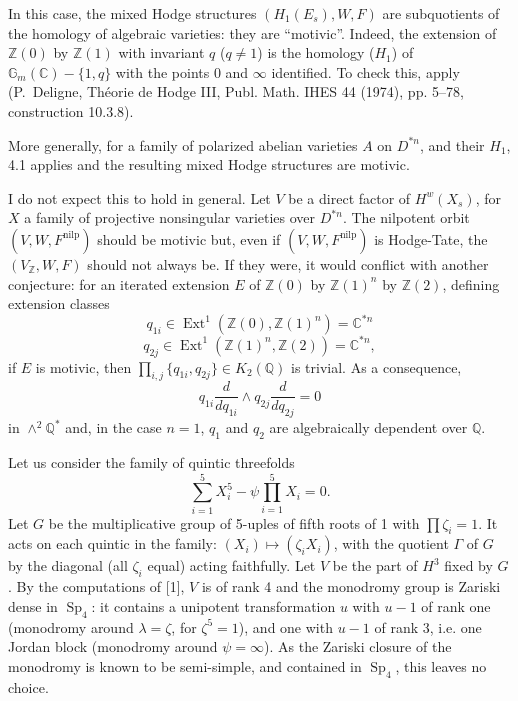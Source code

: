 \documentclass[11pt,a4paper]{article}
\theoremstyle{plain}
\theoremstyle{definition}
\DeclareMathOperator{\Ext}{Ext}
\DeclareMathOperator{\Sp}{Sp}
\begin{document}
In this case, the mixed Hodge structures $(H_{1}(E_{s}), W, F)$ are subquotients of the homology of algebraic varieties: they are ``motivic''. Indeed, the extension of $\mathbb{Z}(0)$ by $\mathbb{Z}(1)$ with invariant $q$ ($q \neq 1$) is the homology ($H_{1}$) of $\mathbb{G}_{m}(\mathbb{C}) - \{1,q\}$ with the points 0 and $\infty$ identified. To check this, apply (P.~Deligne, Th\'eorie de Hodge III, Publ. Math. IHES 44 (1974), pp. 5--78, construction 10.3.8).

More generally, for a family of polarized abelian varieties $A$ on $D^{*n}$, and their $H_{1}$, 4.1 applies and the resulting mixed Hodge structures are motivic.

I do not expect this to hold in general. Let $V$ be a direct factor of $H^{w}(X_{s})$, for $X$ a family of projective nonsingular varieties over $D^{*n}$. The nilpotent orbit $(V, W, F^{\text{nilp}})$ should be motivic but, even if $(V, W, F^{\text{nilp}})$ is Hodge-Tate, the $(V_{\mathbb{Z}}, W, F)$ should not always be. If they were, it would conflict with another conjecture: for an iterated extension $E$ of $\mathbb{Z}(0)$ by $\mathbb{Z}(1)^{n}$ by $\mathbb{Z}(2)$, defining extension classes
\[
q_{1i} \in \Ext^{1}(\mathbb{Z}(0), \mathbb{Z}(1)^{n}) = \mathbb{C}^{*n}
\]
\[
q_{2j} \in \Ext^{1}(\mathbb{Z}(1)^{n}, \mathbb{Z}(2)) = \mathbb{C}^{*n},
\]
if $E$ is motivic, then $\prod_{i,j} \{q_{1i}, q_{2j}\} \in K_{2}(\mathbb{Q})$ is trivial. As a consequence,
\[
q_{1i} \frac{d}{d q_{1i}} \wedge q_{2j} \frac{d}{d q_{2j}} = 0
\]
in $\wedge^{2}\mathbb{Q}^{*}$ and, in the case $n=1$, $q_{1}$ and $q_{2}$ are algebraically dependent over $\mathbb{Q}$.

Let us consider the family of quintic threefolds
\[
\sum_{i=1}^{5} X_{i}^{5} - \psi \prod_{i=1}^{5} X_{i} = 0.
\]
Let $G$ be the multiplicative group of 5-uples of fifth roots of 1 with $\prod \zeta_{i} = 1$. It acts on each quintic in the family: $(X_{i}) \mapsto (\zeta_{i}X_{i})$, with the quotient $\Gamma$ of $G$ by the diagonal (all $\zeta_{i}$ equal) acting faithfully. Let $V$ be the part of $H^{3}$ fixed by $G$. By the computations of [1], $V$ is of rank 4 and the monodromy group is Zariski dense in $\Sp_{4}$: it contains a unipotent transformation $u$ with $u-1$ of rank one (monodromy around $\lambda = \zeta$, for $\zeta^{5} = 1$), and one with $u-1$ of rank 3, i.e. one Jordan block (monodromy around $\psi = \infty$). As the Zariski closure of the monodromy is known to be semi-simple, and contained in $\Sp_{4}$, this leaves no choice.
\end{document}
